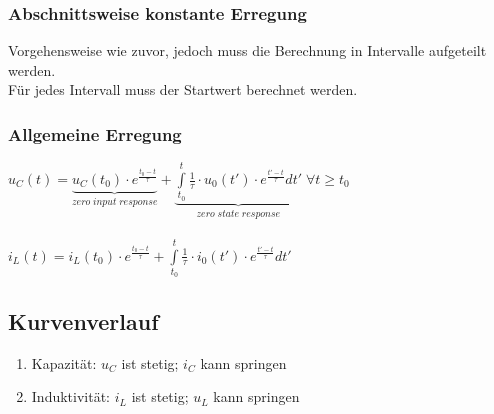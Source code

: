 \documentclass[a4paper,twocolumn,10pt]{article}
\begin{document}
\subsubsection*{Abschnittsweise konstante Erregung}
Vorgehensweise wie zuvor, jedoch muss die Berechnung in Intervalle aufgeteilt werden.\\
Für jedes Intervall muss der Startwert berechnet werden.

\subsubsection*{Allgemeine Erregung}
$u_C(t)=\underbrace{u_C(t_0)\cdot e^{\frac{t_0-t}{\tau}}}_{zero\;input\;response}+\underbrace{\int\limits_{t_0}^{t}\frac{1}{\tau}\cdot u_0(t')\cdot e^{\frac{t'-t}{\tau}}dt'}_{zero\;state\;response}\; \forall t \geq t_0$\\\\
$i_L(t)=i_L(t_0)\cdot e^{\frac{t_0-t}{\tau}}+\int\limits_{t_0}^{t}\frac{1}{\tau}\cdot i_0(t')\cdot e^{\frac{t'-t}{\tau}}dt'$

\subsection*{Kurvenverlauf}
\begin{enumerate}[label=-,leftmargin=3mm]
	\item Kapazität: $u_C$ ist stetig; $i_C$ kann springen
	\item Induktivität: $i_L$ ist stetig; $u_L$ kann springen
\end{enumerate}
\end{document}
